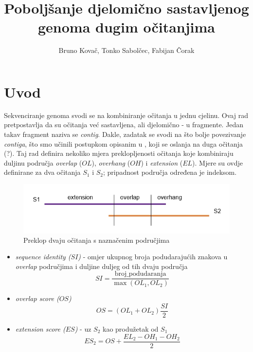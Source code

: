 \documentclass[times, utf8, seminar, numeric]{fer}
\begin{document}
\nocite{*}

\title{Poboljšanje djelomično sastavljenog genoma dugim očitanjima}

\author{Bruno Kovač, Tonko Sabolčec, Fabijan Čorak}


\maketitle

\tableofcontents

\chapter{Uvod}
Sekvenciranje genoma svodi se na kombiniranje očitanja u jednu cjelinu. Ovaj rad pretpostavlja da su očitanja već sastavljena, ali djelomično - u fragmente. Jedan takav fragment naziva se \textit{contig}. Dakle, zadatak se svodi na što bolje povezivanje \textit{contiga}, što smo učinili postupkom opisanim u \cite{Du345983}, koji se oslanja na duga očitanja (?). Taj rad definira nekoliko mjera preklopljenosti očitanja koje kombiniraju duljinu područja \textit{overlap} ($OL$), \textit{overhang} ($OH$) i \textit{extension} ($EL$). Mjere su ovdje definirane za dva očitanja $S_1$ i $S_2$; pripadnost područja određena je indeksom.

\begin{figure}[h]
	\centering
	\includegraphics[width=0.7\linewidth]{img/overlap}
	\caption[]{Preklop dvaju očitanja s naznačenim područjima}
	\label{fig:overlap}
\end{figure}

\begin{itemize}
	\item \textit{sequence identity ($SI$)} - omjer ukupnog broja podudarajućih znakova u \textit{overlap} područjima i duljine duljeg od tih dvaju područja
		\[ SI = \frac{\text{broj\_podudaranja}}{\max(OL_1, OL_2)} \]
	\item \textit{overlap score ($OS$)}
		\[ OS = \left(OL_1 + OL_2\right)\frac{SI}{2} \]
	\item \textit{extension score ($ES$)} - uz $S_2$ kao produžetak od $S_1$
		\[ ES_2 = OS + \frac{EL_2 - OH_1 - OH_2}{2} \]
\end{itemize}
\end{document}
